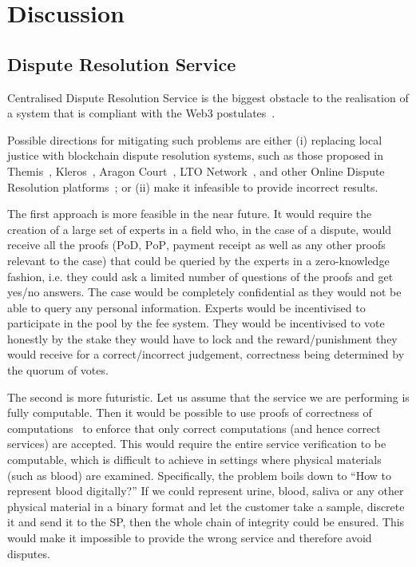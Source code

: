\documentclass[pdftex,twocolumn,epjc3]{svjour3}
\begin{document}
{\section{Discussion}
\label{sec:discussion}

\subsection{Dispute Resolution Service}\label{sec:decentralised-justice}
Centralised Dispute Resolution Service is the biggest obstacle to the realisation of a system that is compliant with the Web3 postulates~\cite{ethereumWhatWeb3Why2023}.

Possible directions for mitigating such problems are either (i) replacing local justice with blockchain dispute resolution systems, such as those proposed in Themis~\cite{mengThemisDecentralizedEscrow2019}, Kleros~\cite{bergollaKlerosSociolegalCase2022, gudkovCrowdArbitrationBlockchain2020}, Aragon Court~\cite{aragonDecentralizedDisputeResolution}, LTO Network~\cite{ltonetworkNextGenBlockchainB2B}, and other Online Dispute Resolution platforms~\cite{allenGovernanceBlockchainDispute2019}; or (ii) make it infeasible to provide incorrect results.

The first approach is more feasible in the near future. It would require the creation of a large set of experts in a field who, in the case of a dispute, would receive all the proofs ($\mathrm{PoD}$, $\mathrm{PoP}$, payment $\mathrm{receipt}$ as well as any other proofs relevant to the case) that could be queried by the experts in a zero-knowledge fashion, i.e. they could ask a limited number of questions of the proofs and get yes/no answers. The case would be completely confidential as they would not be able to query any personal information. Experts would be incentivised to participate in the pool by the fee system. They would be incentivised to vote honestly by the stake they would have to lock and the reward/punishment they would receive for a correct/incorrect judgement, correctness being determined by the quorum of votes.

The second is more futuristic. Let us assume that the service we are performing is fully computable. Then it would be possible to use proofs of correctness of computations~\cite{ben-sassonSNARKsVerifyingProgram2013} to enforce that only correct computations (and hence correct services) are accepted. This would require the entire service verification to be computable, which is difficult to achieve in settings where physical materials (such as blood) are examined. Specifically, the problem boils down to ``How to represent blood digitally?'' If we could represent urine, blood, saliva or any other physical material in a binary format and let the customer take a sample, discrete it and send it to the SP, then the whole chain of integrity could be ensured. This would make it impossible to provide the wrong service and therefore avoid disputes.

}
\end{document}

